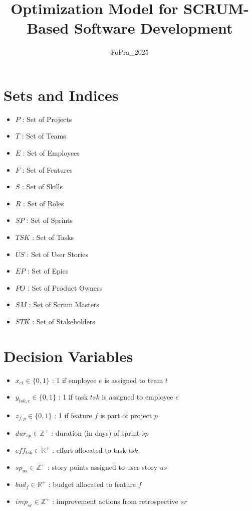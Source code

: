 \documentclass{article}
\title{Optimization Model for SCRUM-Based Software Development}
\author{FoPra\_2025}
\date{}
\begin{document}
\maketitle

\section*{Sets and Indices}
\begin{itemize}
    \item $P$ : Set of Projects
    \item $T$ : Set of Teams
    \item $E$ : Set of Employees
    \item $F$ : Set of Features
    \item $S$ : Set of Skills
    \item $R$ : Set of Roles
    \item $SP$ : Set of Sprints
    \item $TSK$ : Set of Tasks
    \item $US$ : Set of User Stories
    \item $EP$ : Set of Epics
    \item $PO$ : Set of Product Owners
    \item $SM$ : Set of Scrum Masters
    \item $STK$ : Set of Stakeholders
\end{itemize}

\section*{Decision Variables}
\begin{itemize}
    \item $x_{et} \in \{0,1\}$ : 1 if employee $e$ is assigned to team $t$
    \item $y_{tsk,e} \in \{0,1\}$ : 1 if task $tsk$ is assigned to employee $e$
    \item $z_{f,p} \in \{0,1\}$ : 1 if feature $f$ is part of project $p$
    \item $dur_{sp} \in \mathbb{Z}^+$ : duration (in days) of sprint $sp$
    \item $eff_{tsk} \in \mathbb{R}^+$ : effort allocated to task $tsk$
    \item $sp_{us} \in \mathbb{Z}^+$ : story points assigned to user story $us$
    \item $bud_{f} \in \mathbb{R}^+$ : budget allocated to feature $f$
    \item $imp_{sr} \in \mathbb{Z}^+$ : improvement actions from retrospective $sr$
\end{itemize}
\end{document}
